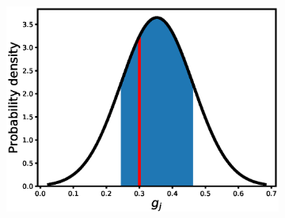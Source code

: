 \documentclass[12pt, table]{article}
\begin{document}
\begin{figure}[H]

   \centering
   \begin{subfigure}[b]{0.45\textwidth}
       \includegraphics[width=1\textwidth, height=0.24\textheight]{figexple2/fgb}
      

\end{subfigure}
\end{figure}
\end{document}
